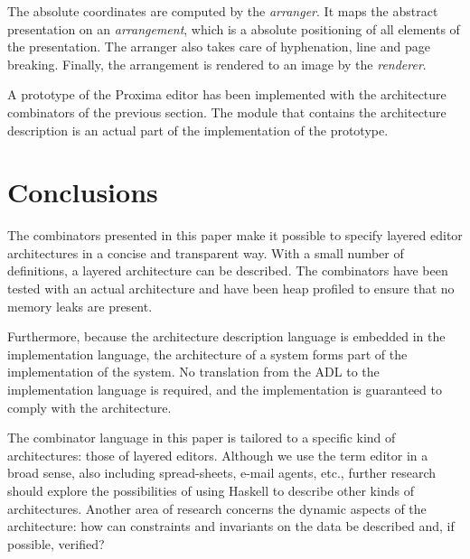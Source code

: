 The absolute coordinates are computed by the {\em arranger}. It maps the abstract presentation on an {\em arrangement}, which is a absolute positioning of all elements of the presentation. The arranger also takes care of hyphenation, line and page breaking. Finally, the arrangement is rendered to an image by the {\em renderer}.

A prototype of the Proxima editor has been implemented with the architecture combinators of the previous section. The module that contains the architecture description is an actual part of the implementation of the prototype.

%																
%																
%																
\section{Conclusions} \label{secthaskellconclusions}

The combinators presented in this paper make it possible to specify layered editor architectures in a concise and transparent way. With a small number of definitions, a layered architecture can be described. The combinators have been tested with an actual architecture and have been heap profiled to ensure that no memory leaks are present.

Furthermore, because the architecture description language is embedded in the implementation language, the architecture of a system forms part of the implementation of the system. No translation from the ADL to the implementation language is required, and the implementation is guaranteed to comply with the architecture.

The combinator language in this paper is tailored to a specific kind of architectures: those of layered editors. Although we use the term editor in a broad sense, also including spread-sheets, e-mail agents, etc., further research should explore the possibilities of using Haskell to describe other kinds of architectures. Another area of research concerns the dynamic aspects of the architecture: how can constraints and invariants on the data be described and, if possible, verified?
